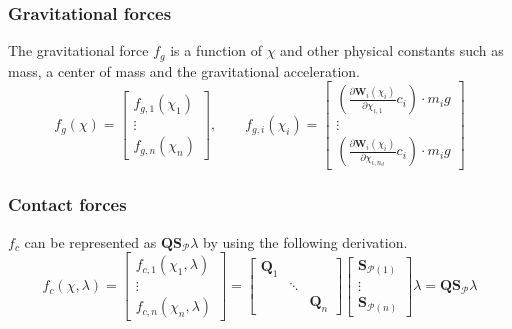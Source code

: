 \documentclass[a4paper,10pt]{article}
\begin{document}
\subsubsection{Gravitational forces}
The gravitational force $f_g$ is a function of $\chi$ and other
physical constants such as mass, a center of mass and the gravitational
acceleration.
\begin{equation}
f_g(\chi) = \left [
\begin{array}{c}
f_{g,1}(\chi_1 )\\
\vdots\\
f_{g,n}(\chi_n )
\end{array}
\right ]
,\quad\quad
f_{g,i}(\chi_i) = \left [
\begin{array}{c}
\left( \frac{\partial\mathbf{W}_i(\chi_{i})}{\partial\chi_{i,1}}c_i \right) \cdot m_i g\\
\vdots\\
\left( \frac{\partial\mathbf{W}_i(\chi_{i})}{\partial\chi_{i,n_d}}c_i \right) \cdot m_i g
\end{array}
\right ]
\end{equation}

\subsubsection{Contact forces}
$f_c$ can be represented as $\mathbf{Q}\mathbf{S}_\mathcal{P}\lambda$ by using the following derivation.
\begin{equation}\label{f_c_lin}
f_c(\chi,\lambda) = \left [
\begin{array}{c}
f_{c,1}(\chi_1, \lambda )\\
\vdots\\
f_{c,n}(\chi_n, \lambda )
\end{array}
\right ]
=
\left [
\begin{array}{ccc}
\mathbf{Q}_1    &            &              \\
                &  \ddots    &              \\
                &            & \mathbf{Q}_n
\end{array}
\right ]
\left [
\begin{array}{c}
\mathbf{S}_{\mathcal{P}(1)}\\
\vdots\\
\mathbf{S}_{\mathcal{P}(n)}
\end{array}
\right ]
\lambda
=
\mathbf{Q} \mathbf{S}_\mathcal{P} \lambda
\end{equation}
\end{document}
